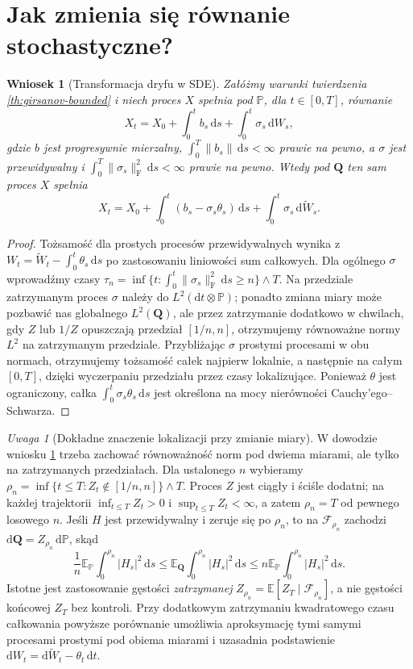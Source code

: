\documentclass[11pt,a4paper,oneside]{report}
\numberwithin{equation}{chapter}
\theoremstyle{plain}
\newtheorem{wniosek}[twierdzenie]{Wniosek}
\theoremstyle{definition}
\theoremstyle{remark}
\newtheorem{uwaga}{Uwaga}[chapter]
\newcommand{\Prob}{\mathbb{P}}
\newcommand{\E}{\mathbb{E}}
\newcommand{\calF}{\mathcal{F}}
\newcommand{\dd}{\mathrm{d}}
\newcommand{\norm}[1]{\lVert #1\rVert}
\begin{document}
\section{Jak zmienia się równanie stochastyczne?}

\begin{wniosek}[Transformacja dryfu w SDE]
\label{cor:girsanov-sde}
Załóżmy warunki twierdzenia \ref{th:girsanov-bounded}
i niech proces $X$ spełnia pod $\Prob$, dla
$t\in[0,T]$, równanie
\[
X_t=X_0+\int_0^tb_s\,\dd s+\int_0^t\sigma_s\,\dd W_s,
\]
gdzie $b$ jest progresywnie mierzalny,
$\int_0^T\norm{b_s}\,\dd s<\infty$ prawie na pewno,
a $\sigma$ jest przewidywalny i
$\int_0^T\norm{\sigma_s}_{\mathrm F}^2\,\dd s<\infty$
prawie na pewno. Wtedy pod $\mathbf Q$ ten sam proces $X$
spełnia
\[
X_t=X_0+\int_0^t(b_s-\sigma_s\theta_s)\,\dd s
        +\int_0^t\sigma_s\,\dd\widetilde W_s.
\tag{8.8}\label{eq:girsanov-sde}
\]
\end{wniosek}
\begin{proof}
Tożsamość dla prostych procesów przewidywalnych wynika
z $W_t=\widetilde W_t-\int_0^t\theta_s\,\dd s$
po zastosowaniu liniowości sum całkowych.
Dla ogólnego $\sigma$ wprowadźmy czasy
$\tau_n=\inf\{t:\int_0^t\norm{\sigma_s}_{\mathrm F}^2\,\dd s\ge n\}\wedge T$.
Na przedziale zatrzymanym proces $\sigma$ należy do
$L^2(\dd t\otimes\Prob)$; ponadto zmiana miary może
pozbawić nas globalnego $L^2(\mathbf Q)$, ale przez
zatrzymanie dodatkowo w chwilach, gdy $Z$ lub $1/Z$
opuszczają przedział $[1/n,n]$, otrzymujemy równoważne
normy $L^2$ na zatrzymanym przedziale.
Przybliżając $\sigma$ prostymi procesami w obu normach,
otrzymujemy tożsamość całek najpierw lokalnie, a następnie
na całym $[0,T]$, dzięki wyczerpaniu przedziału przez
czasy lokalizujące. Ponieważ $\theta$ jest ograniczony,
całka $\int_0^t\sigma_s\theta_s\,\dd s$ jest określona
na mocy nierówności Cauchy'ego--Schwarza.
\end{proof}


\begin{uwaga}[Dokładne znaczenie lokalizacji przy zmianie miary]
W dowodzie wniosku \ref{cor:girsanov-sde} trzeba zachować
równoważność norm pod dwiema miarami, ale tylko na
zatrzymanych przedziałach. Dla ustalonego $n$ wybieramy
$\rho_n=\inf\{t\le T:Z_t\notin[1/n,n]\}\wedge T$.
Proces $Z$ jest ciągły i ściśle dodatni; na każdej trajektorii
$\inf_{t\le T}Z_t>0$ i $\sup_{t\le T}Z_t<\infty$,
a zatem $\rho_n=T$ od pewnego losowego $n$.
Jeśli $H$ jest przewidywalny i zeruje się po $\rho_n$,
to na $\calF_{\rho_n}$ zachodzi
$\dd\mathbf Q=Z_{\rho_n}\,\dd\Prob$, skąd
\[
  \frac1n\E_{\Prob}\int_0^{\rho_n}|H_s|^2\,\dd s
 \le \E_{\mathbf Q}\int_0^{\rho_n}|H_s|^2\,\dd s
 \le n\E_{\Prob}\int_0^{\rho_n}|H_s|^2\,\dd s.
\]
Istotne jest zastosowanie gęstości \emph{zatrzymanej}
$Z_{\rho_n}=\E[Z_T\mid\calF_{\rho_n}]$,
a nie gęstości końcowej $Z_T$ bez kontroli.
Przy dodatkowym zatrzymaniu kwadratowego czasu całkowania
powyższe porównanie umożliwia aproksymację tymi samymi
procesami prostymi pod obiema miarami i uzasadnia
podstawienie $\dd W_t=\dd\widetilde W_t-\theta_t\,\dd t$.
\end{uwaga}
\end{document}
